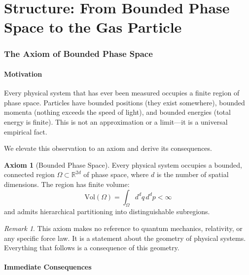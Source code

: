 \documentclass[twocolumn,10pt,a4paper]{article}
\theoremstyle{plain}
\theoremstyle{definition}
\newtheorem{axiom}{Axiom}
\theoremstyle{remark}
\newtheorem{remark}[theorem]{Remark}
\begin{document}
\tableofcontents


\part{Structure: From Bounded Phase Space to the Gas Particle}
\label{part:structure}

\section{The Axiom of Bounded Phase Space}
\label{sec:axiom}

\subsection{Motivation}

Every physical system that has ever been measured occupies a finite region of phase space. Particles have bounded positions (they exist somewhere), bounded momenta (nothing exceeds the speed of light), and bounded energies (total energy is finite). This is not an approximation or a limit---it is a universal empirical fact.

We elevate this observation to an axiom and derive its consequences.

\begin{axiom}[Bounded Phase Space]
\label{ax:bps}
Every physical system occupies a bounded, connected region $\Omega \subset \mathbb{R}^{2d}$ of phase space, where $d$ is the number of spatial dimensions. The region has finite volume:
\begin{equation}
    \mathrm{Vol}(\Omega) = \int_\Omega d^d q \, d^d p < \infty
\end{equation}
and admits hierarchical partitioning into distinguishable subregions.
\end{axiom}

\begin{remark}
This axiom makes no reference to quantum mechanics, relativity, or any specific force law. It is a statement about the geometry of physical systems. Everything that follows is a consequence of this geometry.
\end{remark}

\subsection{Immediate Consequences}
\end{document}
